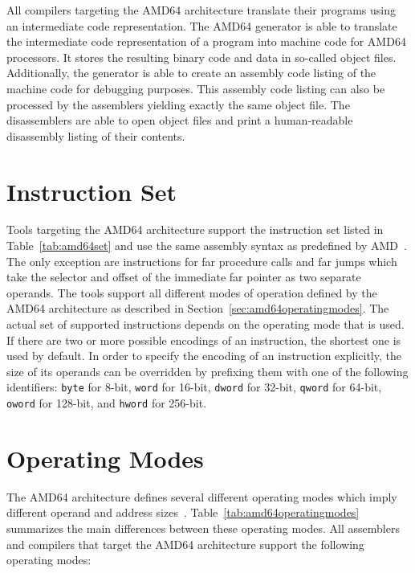All compilers targeting the AMD64 architecture translate their programs using an intermediate code representation.
The AMD64 generator is able to translate the intermediate code representation of a program into machine code for AMD64 processors.
It stores the resulting binary code and data in so-called object files.
Additionally, the generator is able to create an assembly code listing of the machine code for debugging purposes.
This assembly code listing can also be processed by the assemblers yielding exactly the same object file.
The disassemblers are able to open object files and print a human-readable disassembly listing of their contents.
\seeobject\seecode

\section{Instruction Set}

Tools targeting the AMD64 architecture support the instruction set listed in Table~\ref{tab:amd64set} and use the same assembly syntax as predefined by AMD~\cite{amd64:volume3,amd64:volume4,amd64:volume5}.
The only exception are instructions for far procedure calls and far jumps which take the selector and offset of the immediate far pointer as two separate operands.
The tools support all different modes of operation defined by the AMD64 architecture as described in Section~\ref{sec:amd64operatingmodes}.
The actual set of supported instructions depends on the operating mode that is used.
If there are two or more possible encodings of an instruction, the shortest one is used by default.
In order to specify the encoding of an instruction explicitly, the size of its operands can be overridden by prefixing them with one of the following identifiers:
\texttt{byte} for 8-bit, \texttt{word} for 16-bit, \texttt{dword} for 32-bit, \texttt{qword} for 64-bit, \texttt{oword} for 128-bit, and \texttt{hword} for 256-bit.
\seeassembly


\section{Operating Modes}\label{sec:amd64operatingmodes}

The AMD64 architecture defines several different operating modes which imply different operand and address sizes~\cite{amd64:volume1}.
Table~\ref{tab:amd64operatingmodes} summarizes the main differences between these operating modes.
All assemblers and compilers that target the AMD64 architecture support the following operating modes:

